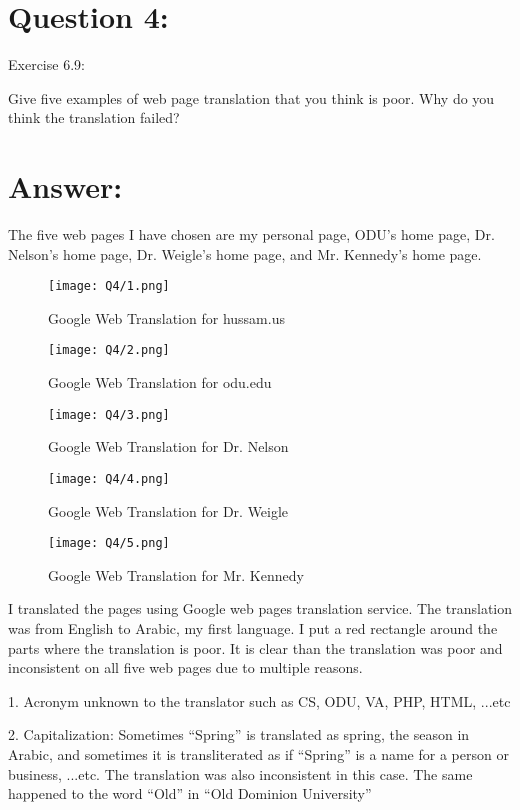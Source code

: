 \section*{Question 4:}
Exercise 6.9:

Give five examples of web page translation that you think is poor. Why do you think the translation failed?

\section*{Answer:}

The five web pages I have chosen are my personal page, ODU's home page, Dr. Nelson's home page, Dr. Weigle's home page, and Mr. Kennedy's home page.

\begin{figure}[h]
\caption{Google Web Translation for hussam.us}
\centering
\texttt{[image: Q4/1.png]}
\end{figure}

\begin{figure}[h]
\caption{Google Web Translation for odu.edu}
\centering
\texttt{[image: Q4/2.png]}
\end{figure}

\begin{figure}[h]
\caption{Google Web Translation for Dr. Nelson}
\centering
\texttt{[image: Q4/3.png]}
\end{figure}

\begin{figure}[h]
\caption{Google Web Translation for Dr. Weigle}
\centering
\texttt{[image: Q4/4.png]}
\end{figure}

\begin{figure}[h]
\caption{Google Web Translation for Mr. Kennedy}
\centering
\texttt{[image: Q4/5.png]}
\end{figure}

I translated the pages using Google web pages translation service. The translation was from English to Arabic, my first language. I put a red rectangle around the parts where the translation is poor. It is clear than the translation was poor and inconsistent on all five web pages due to multiple reasons.

1. Acronym unknown to the translator such as CS, ODU, VA, PHP, HTML, ...etc

2. Capitalization: Sometimes ``Spring'' is translated as spring, the season in Arabic, and sometimes it is transliterated as if ``Spring'' is a name for a person or business, ...etc. The translation was also inconsistent in this case. The same happened to the word ``Old'' in ``Old Dominion University''

